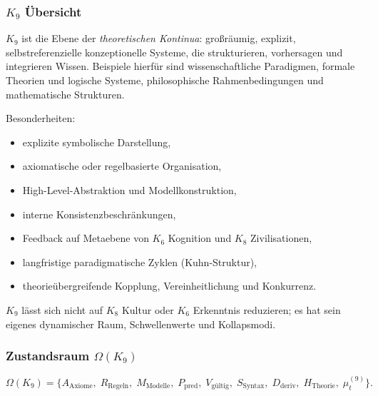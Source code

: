 

\subsubsection{\texorpdfstring{$K_9$}{K_9} Übersicht}
\label{sec:k9-overview}

$K_9$ ist die Ebene der \emph{theoretischen Kontinua}: großräumig, explizit,
selbstreferenzielle konzeptionelle Systeme, die strukturieren, vorhersagen und integrieren
Wissen. Beispiele hierfür sind wissenschaftliche Paradigmen, formale Theorien und logische
Systeme, philosophische Rahmenbedingungen und mathematische Strukturen.

Besonderheiten:
\begin{itemize}
    \item explizite symbolische Darstellung,
    \item axiomatische oder regelbasierte Organisation,
    \item High-Level-Abstraktion und Modellkonstruktion,
    \item interne Konsistenzbeschränkungen,
    \item Feedback auf Metaebene von $K_6$ Kognition und $K_8$ Zivilisationen,
    \item langfristige paradigmatische Zyklen (Kuhn-Struktur),
    \item theorieübergreifende Kopplung, Vereinheitlichung und Konkurrenz.
\end{itemize}

$K_9$ lässt sich nicht auf $K_8$ Kultur oder $K_6$ Erkenntnis reduzieren; es hat sein eigenes
dynamischer Raum, Schwellenwerte und Kollapsmodi.

\subsubsection{Zustandsraum \texorpdfstring{$\Omega(K_9)$}{\Omega(K_9)}}

\[
\Omega(K_9)=
\{
A_{\mathrm{Axiome}},\;
R_{\mathrm{Regeln}},\;
M_{\mathrm{Modelle}},\;
P_{\mathrm{pred}},\;
V_{\mathrm{gültig}},\;
S_{\mathrm{Syntax}},\;
D_{\mathrm{deriv}},\;
H_{\mathrm{Theorie}},\;
\mu^{(9)}_t
\}.
\]

